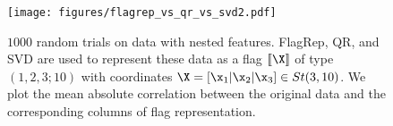 \begin{figure}
    \centering
    \texttt{[image: figures/flagrep\_vs\_qr\_vs\_svd2.pdf]}
    \caption{$1000$ random trials on data with nested features. FlagRep, QR, and SVD are used to represent these data as a flag $[\![\X ]\!]$ of type $(1,2,3;10)$ with coordinates $\X = [\x_1 | \x_2 | \x_3]\in St(3,10)$. We plot the mean absolute correlation between the original data and the corresponding columns of flag representation.\vspace{-3mm}}
    \label{fig:synthetic}
\end{figure}


\flushcolsend
